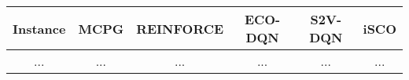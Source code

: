 \documentclass{standalone}
\begin{document}
\begin{tabular}{||c || c|c|c|c|c||} 
    \hline
    Instance & \textbf{MCPG} & \textbf{REINFORCE} & \textbf{ECO-DQN} & \textbf{S2V-DQN} & \textbf{iSCO}\\ [0.5ex] 
    \hline
    ... & ... & ... & ... & ... & ...\\
    \hline
\end{tabular}
\end{document}
